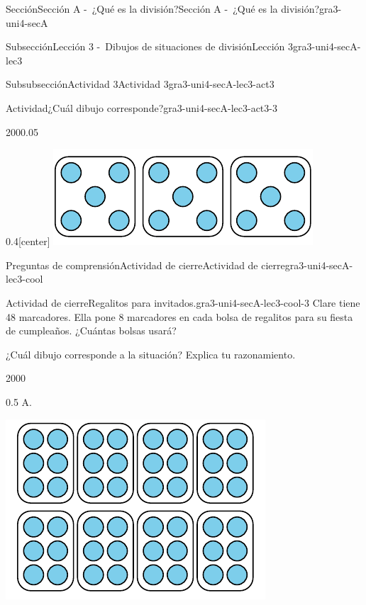 \documentclass[twoside,10pt,]{article}
\begin{document}
\begin{sectionptx}{Sección}{Sección A -~¿Qué es la división?}{}{Sección A -~¿Qué es la división?}{}{}{gra3-uni4-secA}
\begin{subsectionptx}{Subsección}{Lección 3 -~Dibujos de situaciones de división}{}{Lección 3}{}{}{gra3-uni4-secA-lec3}
\begin{subsubsectionptx}{Subsubsección}{Actividad 3}{}{Actividad 3}{}{}{gra3-uni4-secA-lec3-act3}
\begin{activity}{Actividad}{¿Cuál dibujo corresponde?}{gra3-uni4-secA-lec3-act3-3}
\begin{sidebyside}{2}{0}{0}{0.05}
\begin{sbspanel}{0.4}[center]
\includegraphics[width=\linewidth]{external/svg-source/tikz-file-149315.pdf}
\end{sbspanel}%
\end{sidebyside}%
\end{activity}%
\end{subsubsectionptx}
%
%
\typeout{************************************************}
\typeout{************************************************}
%
\begin{reading-questions-subsubsection}{Preguntas de comprensión}{Actividad de cierre}{}{Actividad de cierre}{}{}{gra3-uni4-secA-lec3-cool}
\begin{project}{Actividad de cierre}{Regalitos para invitados.}{gra3-uni4-secA-lec3-cool-3}%
Clare tiene 48 marcadores. Ella pone 8 marcadores en cada bolsa de regalitos para su fiesta de cumpleaños. ¿Cuántas bolsas usará?%
\par
¿Cuál dibujo corresponde a la situación? Explica tu razonamiento.%
\begin{sidebyside}{2}{0}{0}{0}%
\begin{sbspanel}{0.5}%
A.%
\par
\includegraphics[width=\linewidth]{external/svg-source/tikz-file-246306.pdf}

\end{sbspanel}
\end{sidebyside}
\end{project}
\end{reading-questions-subsubsection}
\end{subsectionptx}
\end{sectionptx}
\end{document}
